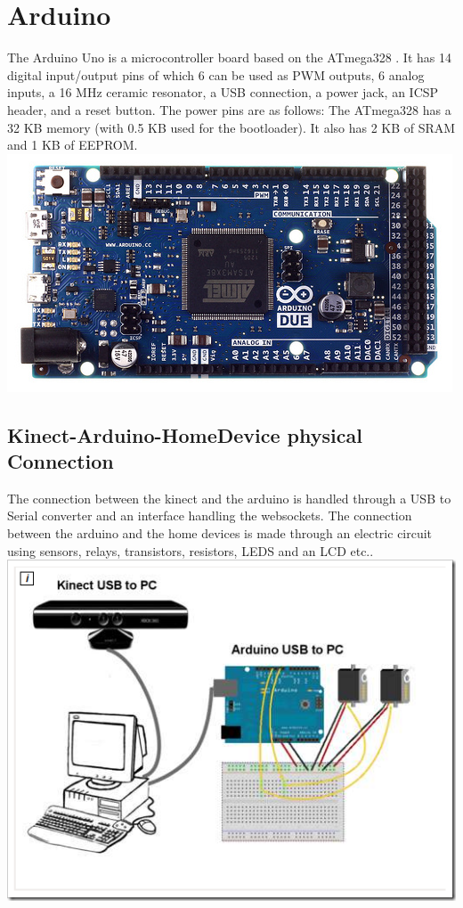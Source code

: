 \section{Arduino}

The Arduino Uno is a microcontroller board based on the ATmega328 . It has 14 digital input/output pins of which 6 can be used as PWM outputs, 6 analog inputs, a 16 MHz ceramic resonator, a USB connection, a power jack, an ICSP header, and a reset button.
The power pins are as follows:
The ATmega328 has a 32 KB memory (with 0.5 KB used for the bootloader). It also has 2 KB of SRAM and 1 KB of EEPROM.
\includegraphics[scale=2]{ArduinoUNOBoard.jpg}

\subsection{Kinect-Arduino-HomeDevice physical Connection}

The connection between the kinect and the arduino is handled through a USB to Serial converter and an interface handling the websockets.
The connection between the arduino and the home devices is made through an electric circuit using sensors, relays, transistors, resistors, LEDS and an LCD etc..
\includegraphics[scale=2]{Kinect-Arduino-Connection.png}

